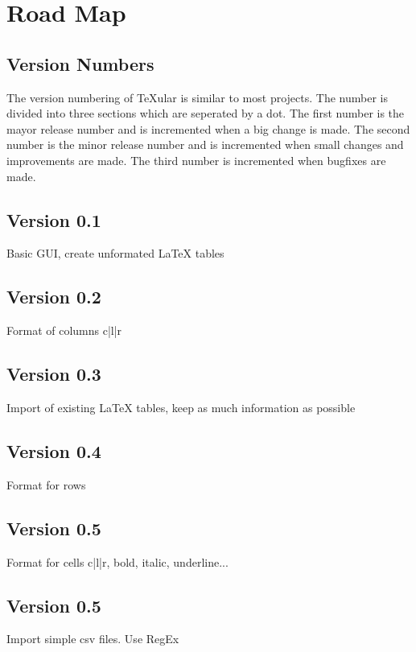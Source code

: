 





\section{Road Map}

\subsection{Version Numbers}
The version numbering of TeXular is similar to most projects.
The number is divided into three sections which are seperated by a dot. The first number is the mayor release number and is incremented when a big change is made. The second number is the minor release number and is incremented when small changes and improvements are made. The third number is incremented when bugfixes are made.


\subsection{Version 0.1}

Basic GUI, create unformated LaTeX tables

\subsection{Version 0.2}
Format of columns {c|l|r}

\subsection{Version 0.3}
Import of existing LaTeX tables, keep as much information as possible


\subsection{Version 0.4}
Format for rows

\subsection{Version 0.5}
Format for cells {c|l|r}, bold, italic, underline...

\subsection{Version 0.5}
Import simple csv files. Use RegEx

